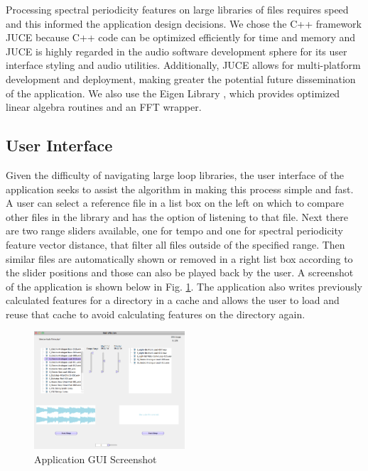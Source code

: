\documentclass{article}
\begin{document}
Processing spectral periodicity features on large libraries of files requires speed and this informed the application design decisions. We chose the C++ framework JUCE \cite{juce} because C++ code can be optimized efficiently for time and memory and JUCE is highly regarded in the audio software development sphere for its user interface styling and audio utilities. Additionally, JUCE allows for multi-platform development and deployment, making greater the potential future dissemination of the application. We also use the Eigen Library \cite{eigenweb}, which provides optimized linear algebra routines and an FFT wrapper.

\subsection{User Interface}
Given the difficulty of navigating large loop libraries, the user interface of the application seeks to assist the algorithm in making this process simple and fast. A user can select a reference file in a list box on the left on which to compare other files in the library and has the option of listening to that file. Next there are two range sliders available, one for tempo and one for spectral periodicity feature vector distance, that filter all files outside of the specified range. Then similar files are automatically shown or removed in a right list box according to the slider positions and those can also be played back by the user. A screenshot of the application is shown below in Fig. \ref{fig:gui}. The application also writes previously calculated features for a directory in a cache and allows the user to load and reuse that cache to avoid calculating features on the directory again.

\begin{figure}[h!]
  \centering
    \includegraphics[width=0.5\textwidth]{fLoop_gui.png}
      \caption{Application GUI Screenshot}\label{fig:gui}
\end{figure}
\end{document}
